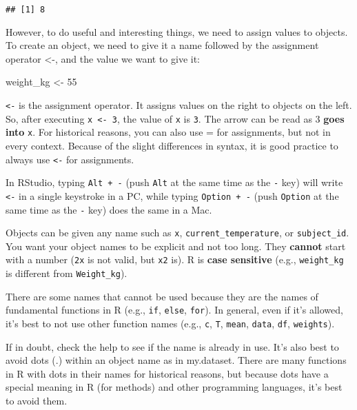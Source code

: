 \documentclass[]{book}
\newenvironment{Shaded}{\begin{snugshade}}{\end{snugshade}}
\newcommand{\DecValTok}[1]{\textcolor[rgb]{0.00,0.00,0.81}{#1}}
\newcommand{\StringTok}[1]{\textcolor[rgb]{0.31,0.60,0.02}{#1}}
\newcommand{\NormalTok}[1]{#1}
\begin{document}
\begin{verbatim}
## [1] 8
\end{verbatim}

However, to do useful and interesting things, we need to assign values
to objects. To create an object, we need to give it a name followed by
the assignment operator \textless{}-, and the value we want to give it:

\begin{Shaded}
\begin{Highlighting}[]
\NormalTok{weight_kg <-}\StringTok{ }\DecValTok{55}
\end{Highlighting}
\end{Shaded}

\texttt{\textless{}-} is the assignment operator. It assigns values on
the right to objects on the left. So, after executing
\texttt{x\ \textless{}-\ 3}, the value of \texttt{x} is \texttt{3}. The
arrow can be read as 3 \textbf{goes into} \texttt{x}. For historical
reasons, you can also use = for assignments, but not in every context.
Because of the slight differences in syntax, it is good practice to
always use \texttt{\textless{}-} for assignments.

In RStudio, typing \texttt{Alt\ +\ -} (push \texttt{Alt} at the same
time as the \texttt{-} key) will write \texttt{\textless{}-} in a single
keystroke in a PC, while typing \texttt{Option\ +\ -} (push
\texttt{Option} at the same time as the \texttt{-} key) does the same in
a Mac.

Objects can be given any name such as \texttt{x},
\texttt{current\_temperature}, or \texttt{subject\_id}. You want your
object names to be explicit and not too long. They \textbf{cannot} start
with a number (\texttt{2x} is not valid, but \texttt{x2} is). R is
\textbf{case sensitive} (e.g., \texttt{weight\_kg} is different from
\texttt{Weight\_kg}).

There are some names that cannot be used because they are the names of
fundamental functions in R (e.g., \texttt{if}, \texttt{else},
\texttt{for}). In general, even if it's allowed, it's best to not use
other function names (e.g., \texttt{c}, \texttt{T}, \texttt{mean},
\texttt{data}, \texttt{df}, \texttt{weights}).

If in doubt, check the help to see if the name is already in use. It's
also best to avoid dots (.) within an object name as in my.dataset.
There are many functions in R with dots in their names for historical
reasons, but because dots have a special meaning in R (for methods) and
other programming languages, it's best to avoid them.
\end{document}
